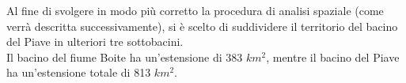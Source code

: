 Al fine di svolgere in modo più corretto la procedura di analisi spaziale (come verrà descritta successivamente), si è scelto di suddividere il territorio del bacino del Piave in ulteriori tre sottobacini.\\
Il bacino del fiume Boite ha un'estensione di 383 $km^2$, mentre il bacino del Piave ha un'estensione totale di 813 $km^2$.\\
